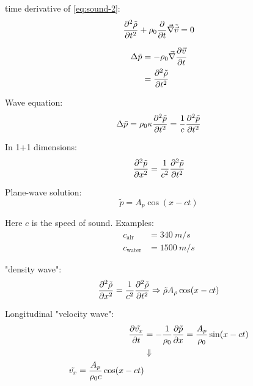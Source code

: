 time derivative of \eqref{eq:sound-2}:
\begin{equation}
\frac{\partial^2 \tilde{\rho}}{\partial t^2}+\rho_0\frac{\partial }{\partial t}\vec{\nabla}\tilde{\vec{v}}=0
\end{equation}

\begin{align}
\Delta\tilde{p} &= -\rho_0\vec{\nabla}\frac{\partial \vec{v}}{\partial t} \\
&= \frac{\partial^2 \tilde{\rho}}{\partial t^2}
\end{align}

Wave equation:
\begin{equation}
\Delta\tilde{p} = \rho_0\kappa\frac{\partial^2 \tilde{p}}{\partial t^2} = \frac{1}{c}\frac{\partial^2 \tilde{p}}{\partial t^2}
\end{equation}

In 1+1 dimensions:
\begin{equation}
\frac{\partial^2 \tilde{p}}{\partial x^2} = \frac{1}{c^2}\frac{\partial^2 \tilde{p}}{\partial t^2}
\end{equation}

Plane-wave solution:
\begin{equation}
\tilde{p} = A_p\cos(x-ct)
\end{equation}

Here $c$ is the speed of sound. Examples:
\begin{align}
c_\mathrm{air} &= \SI{340}{m/s} \\
c_\mathrm{water} &= \SI{1500}{m/s}
\end{align}


"density wave":
\begin{equation}
\frac{\partial^2 \tilde{\rho}}{\partial x^2} = \frac{1}{c^2}\frac{\partial^2 \tilde{\rho}}{\partial t^2} \Rightarrow \tilde{\rho}A_\rho\cos(x-ct)
\end{equation}

Longitudinal "velocity wave":
\begin{align}
\frac{\partial \tilde{v_x}}{\partial t} &= -\frac{1}{\rho_0}\frac{\partial \tilde{p}}{\partial x} = \frac{A_p}{\rho_0}\sin(x-ct) \\
&\Downarrow\notag\\
\tilde{v_x} = \frac{A_p}{\rho_0c}\cos(x-ct)
\end{align}

